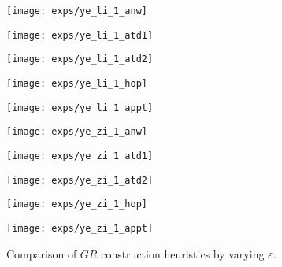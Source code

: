 \documentclass{USC-Thesis}
\numberwithin{equation}{chapter}
\begin{document}
\begin{figure*}[!ht]
	\begin{minipage}[b]{0.195\linewidth}
	\centering
		\texttt{[image: exps/ye\_li\_1\_anw]}
		\label{fig:ye_li_1_anw}
	\end{minipage}
	\begin{minipage}[b]{0.195\linewidth}
	\centering
		\texttt{[image: exps/ye\_li\_1\_atd1]}
		\label{fig:ye_li_1_atd1}
	\end{minipage}
	\begin{minipage}[b]{0.195\linewidth}
	\centering
		\texttt{[image: exps/ye\_li\_1\_atd2]}
		\label{fig:ye_li_1_atd2}
	\end{minipage}	
	\begin{minipage}[b]{0.195\linewidth}
	\centering
		\texttt{[image: exps/ye\_li\_1\_hop]}
		\label{fig:ye_li_1_hop}
	\end{minipage}
	\begin{minipage}[b]{0.195\linewidth}
		\centering
		\texttt{[image: exps/ye\_li\_1\_appt]}
		\label{fig:ye_li_1_appt}
	\end{minipage}

	\begin{minipage}[b]{0.195\linewidth}
	\centering
		\texttt{[image: exps/ye\_zi\_1\_anw]}
		\label{fig:ye_zi_1_anw}
	\end{minipage}
	\begin{minipage}[b]{0.195\linewidth}
	\centering
		\texttt{[image: exps/ye\_zi\_1\_atd1]}
		\label{fig:ye_zi_1_atd1}
	\end{minipage}
	\begin{minipage}[b]{0.195\linewidth}
	\centering
		\texttt{[image: exps/ye\_zi\_1\_atd2]}
		\label{fig:ye_zi_1_atd2}
	\end{minipage}	
	\begin{minipage}[b]{0.195\linewidth}
	\centering
		\texttt{[image: exps/ye\_zi\_1\_hop]}
		\label{fig:ye_zi_1_hop}
	\end{minipage}
	\begin{minipage}[b]{0.195\linewidth}
		\centering
		\texttt{[image: exps/ye\_zi\_1\_appt]}
		\label{fig:ye_zi_1_appt}
	\end{minipage}
	\caption{Comparison of $\mathit{GR}$ construction heuristics by varying $\varepsilon$.}
\label{fig:improved_geocast}
\end{figure*}
\end{document}
